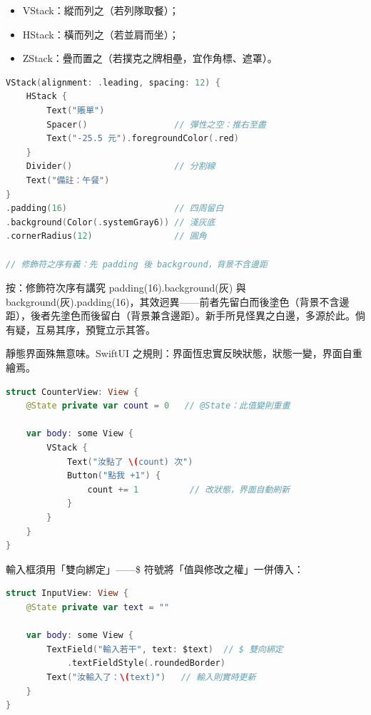 \begin{itemize}
  \item VStack：縱而列之（若列隊取餐）；
  \item HStack：橫而列之（若並肩而坐）；
  \item ZStack：疊而置之（若撲克之牌相壘，宜作角標、遮罩）。
\end{itemize}

\begin{lstlisting}[language=Swift]
VStack(alignment: .leading, spacing: 12) {
    HStack {
        Text("賬單")
        Spacer()                 // 彈性之空：推右至盡
        Text("-25.5 元").foregroundColor(.red)
    }
    Divider()                    // 分割線
    Text("備註：午餐")
}
.padding(16)                     // 四周留白
.background(Color(.systemGray6)) // 淺灰底
.cornerRadius(12)                // 圓角

// 修飾符之序有義：先 padding 後 background，背景不含邊距
\end{lstlisting}

\begin{tcbwarn}{按：修飾符次序有講究}
padding(16).background(灰) 與 background(灰).padding(16)，其效迥異——前者先留白而後塗色（背景不含邊距），後者先塗色而後留白（背景兼含邊距）。新手所見怪異之白邊，多源於此。倘有疑，互易其序，預覽立示其答。

\end{tcbwarn}


靜態界面殊無意味。SwiftUI 之規則：界面恆忠實反映狀態，狀態一變，界面自重繪焉。

\begin{lstlisting}[language=Swift]
struct CounterView: View {
    @State private var count = 0   // @State：此值變則重畫

    var body: some View {
        VStack {
            Text("汝點了 \(count) 次")
            Button("點我 +1") {
                count += 1          // 改狀態，界面自動刷新
            }
        }
    }
}
\end{lstlisting}

輸入框須用「雙向綁定」——\$ 符號將「值與修改之權」一併傳入：

\begin{lstlisting}[language=Swift]
struct InputView: View {
    @State private var text = ""

    var body: some View {
        TextField("輸入若干", text: $text)  // $ 雙向綁定
            .textFieldStyle(.roundedBorder)
        Text("汝輸入了：\(text)")   // 輸入則實時更新
    }
}
\end{lstlisting}

